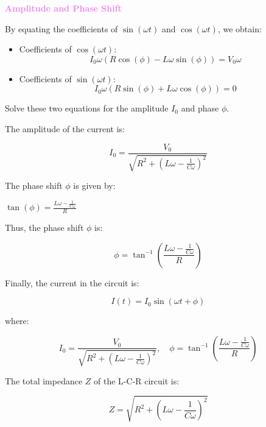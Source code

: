 \documentclass{beamer}
\begin{document}
\begin{frame}

\textcolor{violet}{\textbf{Amplitude and Phase Shift}}

By equating the coefficients of \( \sin(\omega t) \) and \( \cos(\omega t) \), we obtain:

\begin{itemize}
    \item Coefficients of \( \cos(\omega t) \):
    \[
    I_0 \omega \left( R \cos(\phi) - L \omega \sin(\phi) \right) = V_0 \omega
    \]

    \item Coefficients of \( \sin(\omega t) \):
    \[
    I_0 \omega \left( R \sin(\phi) + L \omega \cos(\phi) \right) = 0
    \]
\end{itemize}

Solve these two equations for the amplitude \( I_0 \) and phase \( \phi \).

The amplitude of the current is:

\[
I_0 = \frac{V_0}{\sqrt{R^2 + \left( L \omega - \frac{1}{C \omega} \right)^2}}
\]

The phase shift \( \phi \) is given by:


\hspace{3cm}$\tan(\phi) = \frac{L \omega - \frac{1}{C \omega}}{R}$

Thus, the phase shift \( \phi \) is:
\end{frame}


\begin{frame}

\[
\phi = \tan^{-1}\left( \frac{L \omega - \frac{1}{C \omega}}{R} \right)
\]

Finally, the current in the circuit is:

\[
I(t) = I_0 \sin(\omega t + \phi)
\]

where:

\[
I_0 = \frac{V_0}{\sqrt{R^2 + \left( L \omega - \frac{1}{C \omega} \right)^2}}, \quad \phi = \tan^{-1}\left( \frac{L \omega - \frac{1}{C \omega}}{R} \right)
\]

The total impedance \( Z \) of the L-C-R circuit is:

\[
Z = \sqrt{R^2 + \left( L \omega - \frac{1}{C \omega} \right)^2}
\]
\end{frame}
\end{document}
